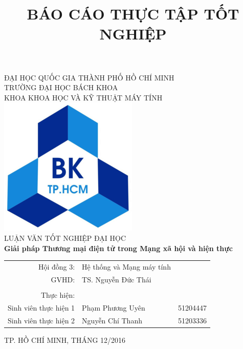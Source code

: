 \documentclass[a4paper,12pt,times,numbered,print,index]{report}
\title{BÁO CÁO THỰC TẬP TỐT NGHIỆP}
\begin{document}
	\begin{center}
		{ ĐẠI HỌC QUỐC GIA THÀNH PHỐ HỒ CHÍ MINH \\
			TRƯỜNG ĐẠI HỌC BÁCH KHOA \\
			KHOA KHOA HỌC VÀ KỸ THUẬT MÁY TÍNH} 
		\\
		\bigskip
		\bigskip
		\bigskip
		\includegraphics[scale=.4]{Graphics/bachkhoa_logo}\\
		\bigskip
		\bigskip
		\bigskip
		LUẬN VĂN TỐT NGHIỆP ĐẠI HỌC \\
		\bigskip
		{\Huge \textbf{Giải pháp Thương mại điện tử trong Mạng xã hội và hiện thực}}
		\bigskip

		
		\begin{table}[h]
			
			\begin{tabular}{rll}
				\hspace{5 cm}  Hội đồng 3: & Hệ thống và Mạng máy tính \\
				\hspace{5 cm}  GVHD: & TS. Nguyễn Đức Thái \\
				\\
				 Thực hiện: \\
				Sinh viên thực hiện 1& Phạm Phương Uyên & 51204447 \\
				Sinh viên thực hiện 2 & Nguyễn Chí Thanh & 51203336 \\
			\end{tabular}
		\end{table}
		\vspace*{\fill}
		{\footnotesize TP. HỒ CHÍ MINH, THÁNG 12/2016}
	\end{center}
	\thispagestyle{empty}
	
	\newpage
		
\end{document}
